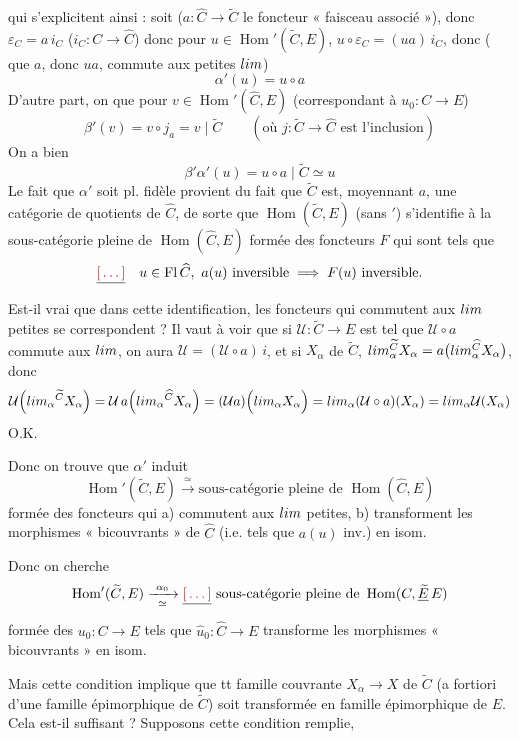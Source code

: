 \documentclass[11pt,a4paper]{article}
\begin{document}
qui s'explicitent ainsi : soit ($a : \widehat{C} \to \widetilde{C}$ le foncteur
« faisceau associé »), donc $\varepsilon_{C} = a\, i_{C}$ ($i_{C} : C \to
\widehat{C}$) donc pour $u \in \operatorname{Hom}'(\widetilde{C},E)$,
$u \circ \varepsilon_{C} = (ua)\, i_{C}$, donc (\struck{\ill{}} que $a$, donc
$ua$, commute aux petites $\varinjlim$)
\[
\alpha'(u) = u \circ a
\]
 D'autre part, on \ill{} que pour $v \in
\operatorname{Hom}'(\widehat{C}, E)$ (correspondant à $u_{0} : C \to E$)
\[
\beta'(v) = v \circ j_{a} = v \mid \widetilde{C}
\qquad (\text{où } j : \widetilde{C} \to \widehat{C} \text{ est l'inclusion})
\]
On a bien
\[
\beta'\alpha'(u) = u \circ a \mid \widetilde{C} \simeq u
\]
Le fait que $\alpha'$ soit pl. fidèle provient du fait que $\widetilde{C}$ est,
moyennant $a$, une catégorie de quotients de $\widehat{C}$, de sorte que
$\operatorname{Hom}(\widetilde{C},E)$ (sans $'$) s'identifie à la
sous-catégorie pleine de $\operatorname{Hom}(\widehat{C},E)$ formée des
foncteurs $F$ qui sont tels que
\[
\struck{\ill{}}\quad u \in \mathrm{Fl}\,\widehat{C},\ a(u) \text{ inversible}
\implies F(u) \text{ inversible.}
\]
Est-il vrai que dans cette identification, les foncteurs qui commutent aux
$\varinjlim$ petites se correspondent ? Il vaut à voir que si $\mathcal{U} :
\widetilde{C} \to E$ est tel que $\mathcal{U} \circ a$ commute aux
$\varinjlim$, \ill{} on aura $\mathcal{U} = (\mathcal{U} \circ a)\, i$, et si
\ill{} $X_{\alpha}$ de $\widetilde{C}$,
$\varinjlim_{\alpha}^{\widetilde{C}} X_{\alpha} =
a\bigl(\varinjlim_{\alpha}^{\widehat{C}} X_{\alpha}\bigr)$, donc
\[
\mathcal{U}\Bigl(\varinjlim_{\alpha}{}^{\widetilde{C}} X_{\alpha}\Bigr)
= \mathcal{U}\, a \Bigl(\varinjlim_{\alpha}{}^{\widehat{C}} X_{\alpha}\Bigr)
= (\mathcal{U}a)\Bigl(\varinjlim_{\alpha} X_{\alpha}\Bigr)
= \varinjlim_{\alpha} (\mathcal{U} \circ a)(X_{\alpha})
= \varinjlim_{\alpha} \mathcal{U}(X_{\alpha})
\]
O.K.

Donc on trouve que $\alpha'$ induit
\[
\operatorname{Hom}'(\widetilde{C}, E) \xrightarrow{\ \simeq\ }
\text{sous-catégorie pleine de } \operatorname{Hom}(\widehat{C}, E)
\]
formée des foncteurs qui a) commutent aux $\varinjlim$ petites, b)
transforment les morphismes « bicouvrants » de $\widehat{C}$ (i.e. tels que
$a(u)$ inv.) en isom.

Donc on cherche
\[
\operatorname{Hom}'(\widetilde{C}, E) \xrightarrow[\ \simeq\ ]{\ \alpha_{0}\ }
\struck{\ill{}} \text{ sous-catégorie pleine de } \operatorname{Hom}(C, \struck{\widetilde{E}}\,E)
\]
formée des $u_{0} : C \to E$ tels que $\widehat{u}_{0} : \widehat{C} \to E$
transforme les morphismes « bicouvrants » en isom.

Mais cette condition implique que tt famille couvrante $X_{\alpha} \to X$ de
$\widetilde{C}$ (a fortiori d'une  famille épimorphique de
$\widetilde{C}$) soit transformée en famille épimorphique de $E$. Cela
est-il suffisant ? Supposons cette condition remplie,

\end{document}
